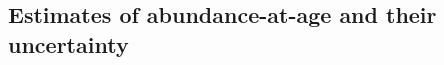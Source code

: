 \documentclass[a4paper 12pt]{article}
\numberwithin{equation}{section}
\begin{document}
\subsection{Estimates of abundance-at-age and their uncertainty}
\label{sec:resultsabundance}
\end{document}
